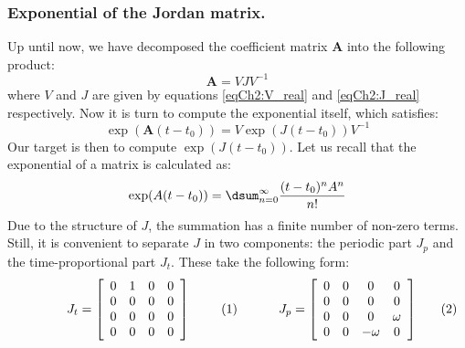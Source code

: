 		\subsubsection{Exponential of the Jordan matrix.}
		\indent Up until now, we have decomposed the coefficient matrix $\bm A$ into the following product:
		\[
		\bm A = V J V^{-1}
		\]
		\noindent where $V$ and $J$ are given by equations \eqref{eqCh2:V_real} and \eqref{eqCh2:J_real} respectively. Now it is turn to compute the exponential itself, which satisfies:
		\begin{equation}
		\exp\left(\bm A (t - t_0) \right) = V \exp\left(J(t - t_0)\right) V^{-1}
		\label{eqCh2:expAt}
		\end{equation}
		\indent Our target is then to compute $\exp\left(J(t - t_0)\right)$. Let us recall that the exponential of a matrix is calculated as:
		\[
		\exp(A(t - t_0)) = \dsum_{n = 0}^{\infty} \dfrac{(t - t_0)^n A^n}{n!}
		\]
		\indent Due to the structure of $J$, the summation has a finite number of non-zero terms. Still, it is convenient to separate $J$ in two components: the periodic part $J_p$ and the time-proportional part $J_t$. These take the following form:\\
		\begin{subequations}
		\begin{minipage}{.5\linewidth}
		\begin{equation}
		J_t = \left[ \begin{array}{cccc}
			0 	& 1	& 0		& 0			\\
			0 	& 0	& 0  	& 0 		\\
			0 	& 0	& 0		& 0	\\
			0 	& 0	& 0 	& 0
			\end{array}\right]
			\label{eqCh2:Jt}
		\end{equation}
		\end{minipage}
		\begin{minipage}{.5\linewidth}
		\begin{equation}
		J_p = \left[ \begin{array}{cccc}
			0 	& 0	& 0		& 0			\\
			0 	& 0	& 0  	& 0 		\\
			0 	& 0	& 0		& \omega	\\
			0 	& 0	& -\omega 	& 0
			\end{array}\right]
			\label{eqCh2:Jp}
		\end{equation}
		\end{minipage}
		\end{subequations}		
